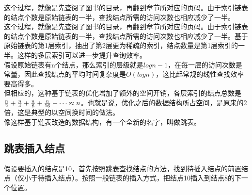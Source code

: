 这个过程，就像是先查阅了图书的目录，再翻到章节所对应的页码。由于索引链表的结点个数是原始链表的一半，查找结点所需的访问次数也相应减少了一半。 \\

这个过程，就像是先查阅了图书的目录，再翻到章节所对应的页码。由于索引链表的结点个数是原始链表的一半，查找结点所需的访问次数也相应减少了一半。基于原始链表的第1层索引，抽出了第2层更为稀疏的索引，结点数量是第1层索引的一半。这样的多层索引可以进一步提升查询效率。 \\

假设原始链表有n个结点，那么索引的层级就是$ logn - 1 $，在每一层的访问次数是常量，因此查找结点的平均时间复杂度是$ O(logn) $，这比起常规的线性查找效率要高得多。 \\

但相应的，这种基于链表的优化增加了额外的空间开销，各层索引的结点总数是$ {n \over 2} + {n \over 4} + {n \over 8} + {n \over 16} + \dots \approx n $。也就是说，优化之后的数据结构所占空间，是原来的2倍，这是典型的以空间换时间的做法。 \\

像这样基于链表改造的数据结构，有一个全新的名字，叫做跳表。

\subsection{跳表插入结点}

假设要插入的结点是10，首先按照跳表查找结点的方法，找到待插入结点的前置结点（仅小于待插入结点）。按照一般链表的插入方式，把结点10插入到结点8的下一个位置。 \\

